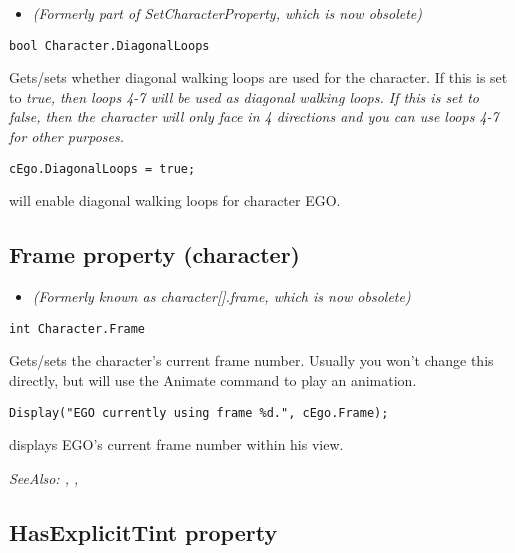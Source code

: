 \begin{itemize}
\item \it{(Formerly part of SetCharacterProperty, which is now obsolete)}
\end{itemize}

\begin{verbatim}
bool Character.DiagonalLoops
\end{verbatim}
Gets/sets whether diagonal walking loops are used for the character. If this is set
to \it{true}, then loops 4-7 will be used as diagonal walking loops. If this is set to
\it{false}, then the character will only face in 4 directions and you can use
loops 4-7 for other purposes.

\begin{verbatim}
cEgo.DiagonalLoops = true;
\end{verbatim}
will enable diagonal walking loops for character EGO.


\subsection{Frame property (character)}\label{Character.Frame}%

\begin{itemize}
\item \it{(Formerly known as character[].frame, which is now obsolete)}
\end{itemize}

\begin{verbatim}
int Character.Frame
\end{verbatim}
Gets/sets the character's current frame number. Usually you won't change this
directly, but will use the Animate command to play an animation.

\begin{verbatim}
Display("EGO currently using frame %d.", cEgo.Frame);
\end{verbatim}
displays EGO's current frame number within his view.

\it{SeeAlso:} ,
,


\subsection{HasExplicitTint property}\label{Character.HasExplicitTint}%

